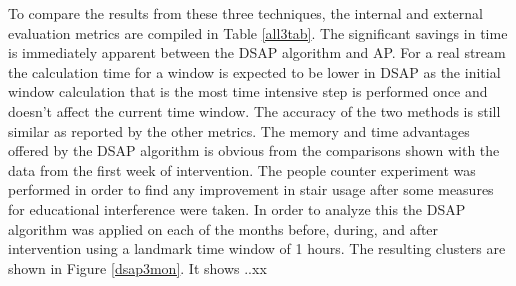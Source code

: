 To compare the results from these three techniques, the internal and external evaluation metrics are compiled in Table \ref{all3tab}. The significant savings in time is immediately apparent between the DSAP algorithm and AP. For a real stream the calculation time for a window is expected to be lower in DSAP as the initial window calculation that is the most time intensive step is performed once and doesn't affect the current time window. The accuracy of the two methods is still similar as reported by the other metrics. 
The memory and time advantages offered by the DSAP algorithm is obvious from the comparisons shown with the data from the first week of intervention. The people counter experiment was performed in order to find any improvement in stair usage after some measures for educational interference were taken. In order to analyze this the DSAP algorithm was applied on each of the months before, during, and after intervention using a landmark time window of 1 hours. The resulting clusters are shown in Figure \ref{dsap3mon}. It shows ..xx




